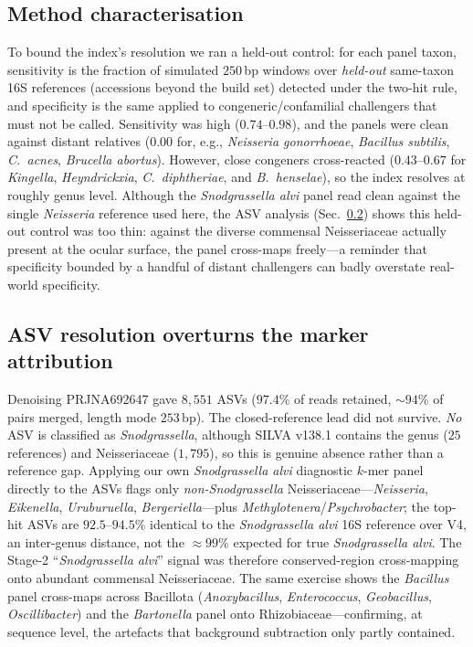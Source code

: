 \documentclass[11pt]{article}
\newcommand{\salvi}{\textit{Snodgrassella alvi}}
\begin{document}
\subsection{Method characterisation}\label{sec:charac}
To bound the index's resolution we ran a held-out control: for each panel taxon,
sensitivity is the fraction of simulated $250$\,bp windows over \emph{held-out}
same-taxon 16S references (accessions beyond the build set) detected under the
two-hit rule, and specificity is the same applied to congeneric/confamilial
challengers that must not be called. Sensitivity was high ($0.74$--$0.98$), and
the panels were clean against distant relatives ($0.00$ for, e.g.,
\textit{Neisseria gonorrhoeae}, \textit{Bacillus subtilis}, \textit{C.\ acnes},
\textit{Brucella abortus}). However, close congeners cross-reacted
($0.43$--$0.67$ for \textit{Kingella}, \textit{Heyndrickxia},
\textit{C.\ diphtheriae}, and \textit{B.\ henselae}), so the index resolves at
roughly genus level. Although the \salvi{} panel read clean against the single
\textit{Neisseria} reference used here, the ASV analysis (Sec.~\ref{sec:asv})
shows this held-out control was too thin: against the diverse commensal
Neisseriaceae actually present at the ocular surface, the panel cross-maps
freely---a reminder that specificity bounded by a handful of distant challengers
can badly overstate real-world specificity.

\subsection{ASV resolution overturns the marker attribution}\label{sec:asv}
Denoising PRJNA692647 gave $8{,}551$ ASVs ($97.4\%$ of reads retained, ${\sim}94\%$
of pairs merged, length mode $253$\,bp). The closed-reference lead did not
survive. \emph{No} ASV is classified as \textit{Snodgrassella}, although SILVA
v138.1 contains the genus ($25$ references) and Neisseriaceae ($1{,}795$), so this
is genuine absence rather than a reference gap. Applying our own \salvi{}
diagnostic $k$-mer panel directly to the ASVs flags only \emph{non-Snodgrassella}
Neisseriaceae---\textit{Neisseria}, \textit{Eikenella}, \textit{Uruburuella},
\textit{Bergeriella}---plus \textit{Methylotenera}/\textit{Psychrobacter}; the
top-hit ASVs are $92.5$--$94.5\%$ identical to the \salvi{} 16S reference over
V4, an inter-genus distance, not the ${\approx}99\%$ expected for true \salvi{}.
The Stage-2 ``\salvi{}'' signal was therefore conserved-region cross-mapping onto
abundant commensal Neisseriaceae. The same exercise shows the \textit{Bacillus}
panel cross-maps across Bacillota (\textit{Anoxybacillus}, \textit{Enterococcus},
\textit{Geobacillus}, \textit{Oscillibacter}) and the \textit{Bartonella} panel
onto Rhizobiaceae---confirming, at sequence level, the artefacts that background
subtraction only partly contained.
\end{document}
